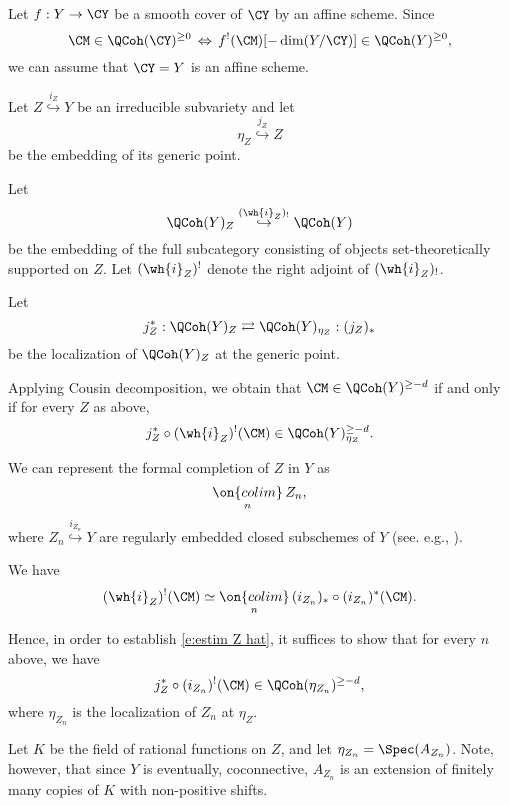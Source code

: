 \documentclass[9pt]{amsart}
\theoremstyle{remark}
\theoremstyle{definition}
\theoremstyle{remark}
\newcommand{\propref}[1]{Proposition~\ref{#1}}
\numberwithin{equation}{section}
\begin{document}
\ssec{Proof of \propref{p:when >0}} \label{ss:proof >0}

\sssec{}

Let $f:Y\to \CY$ be a smooth cover of $\CY$ by an affine scheme. Since
$$\CM\in \QCoh(\CY)^{\geq 0}\, \Leftrightarrow \, f^!(\CM)[-\dim(Y/\CY)]\in \QCoh(Y)^{\geq 0},$$
we can assume that $\CY=Y$ is an affine scheme.

\sssec{}

Let $Z\overset{i_Z}\hookrightarrow Y$ be an 
irreducible subvariety and let 
$$\eta_Z \overset{j_Z}\hookrightarrow Z$$
be the embedding of its generic point. 

\medskip

Let 
$$\QCoh(Y)_Z\overset{(\wh{i}_Z)_!}\hookrightarrow \QCoh(Y)$$
be the embedding of the full subcategory consisting of objects set-theoretically
supported on $Z$. Let $(\wh{i}_Z)^!$ denote the right adjoint of $(\wh{i}_Z)_!$.

\medskip

Let 
$$j_Z^*:\QCoh(Y)_Z\rightleftarrows \QCoh(Y)_{\eta_Z}:(j_Z)_*$$
be the localization of $\QCoh(Y)_Z$ at the generic point.

\medskip

Applying Cousin decomposition, we obtain that $\CM\in \QCoh(Y)^{\geq -d}$ if and
only if for every $Z$ as above,
\begin{equation} \label{e:estim Z hat}
j_Z^*\circ (\wh{i}_Z)^!(\CM)\in \QCoh(Y)^{\geq -d}_{\eta_Z}.
\end{equation} 

\sssec{}

We can represent the formal completion of $Z$ in $Y$ as
$$\underset{n}{\on{colim}}\, Z_n,$$
where $Z_n\overset{i_{Z_n}}\hookrightarrow Y$ are regularly embedded closed 
subschemes of $Y$ (see. e.g., \cite[Proposition 6.7.4]{GaRo1}).

\medskip

We have
$$(\wh{i}_Z)^!(\CM) \simeq \underset{n}{\on{colim}}\, (i_{Z_n})_*\circ (i_{Z_n})^*(\CM).$$

Hence, in order to establish \eqref{e:estim Z hat}, it suffices to show that for every $n$ above, we have
\begin{equation} \label{e:estim Zn}
 j_Z^*\circ (i_{Z_n})^!(\CM)\in \QCoh(\eta_{Z_n})^{\geq -d},
\end{equation} 
where $\eta_{Z_n}$ is the localization of $Z_n$ at $\eta_Z$. 

\sssec{}

Let $K$ be the field of rational functions on $Z$, and let $\eta_{Z_n}=\Spec(A_{Z_n})$. Note, however, that since $Y$ is eventually,
coconnective, $A_{Z_{n}}$ is an extension of finitely many copies of $K$ with non-positive shifts. 
\end{document}
